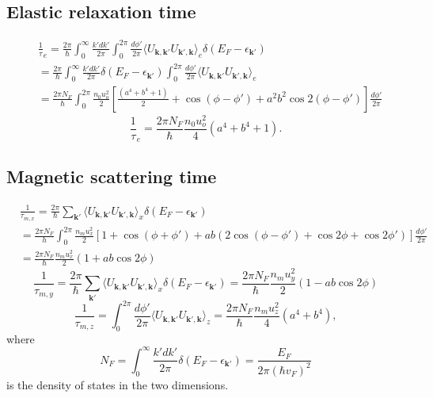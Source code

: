 \documentclass[aps,prb,amsmath,amssymb,footinbib,showpacs,twocolumn]{revtex4-2}
\begin{document}
\begin{widetext}
\subsection{Elastic relaxation time}
\begin{align}
  &\frac{1}{\tau}_{e}= \frac{2\pi}{\hbar}\int_{0}^{\infty}\frac{k'dk'}{2\pi}\int_{0}^{2\pi}\frac{d\phi'}{2\pi}\bigr \langle U_{\textbf{k},\textbf{k}'}U_{\textbf{k}',\textbf{k}}\bigl \rangle_{e}\delta(E_{F}-\epsilon_{\textbf{k}'}) \nonumber\\ &
 = \frac{2\pi}{\hbar}\int_{0}^{\infty}\frac{k'dk'}{2\pi}\delta(E_{F}-\epsilon_{\textbf{k}'})\int_{0}^{2\pi}\frac{d\phi'}{2\pi}\bigr \langle U_{\textbf{k},\textbf{k}'}U_{\textbf{k}',\textbf{k}}\bigl \rangle_{e}\nonumber\\&
 =\frac{2\pi N_{F}}{\hbar}\int_{0}^{2\pi}\frac{n_{0}u^{2}_{o}}{2}\left[\frac{(a^{4}+b^{4}+1)}{2}+\cos(\phi-\phi')+a^{2}b^{2}\cos2(\phi-\phi')\right]\frac{d\phi'}{2\pi} 
\end{align}
\begin{equation}
   \frac{1}{\tau}_{e}=  \frac{2\pi N_{F}}{\hbar}\frac{n_{0}u^{2}_{o}}{4}(a^{4}+b^{4}+1).
\end{equation}
\subsection{Magnetic scattering time}
\begin{align}
      &\frac{1}{\tau_{m,x}}=\frac{2\pi}{\hbar}\sum_{\textbf{k}'}\bigr \langle U_{\textbf{k},\textbf{k}'}U_{\textbf{k}',\textbf{k}}\bigl \rangle_{x}\delta(E_{F}-\epsilon_{\textbf{k}'})\nonumber\\&
      = \frac{2\pi N_{F}}{h}\int_{0}^{2\pi}\frac{n_{m}u^{2}_{x}}{2}\left[1+\cos(\phi+\phi')+ab(2\cos(\phi-\phi')+\cos2\phi+\cos2\phi')\right]\frac{d\phi'}{2\pi} \nonumber\\
     &= \frac{2\pi N_{F}}{\hbar}\frac{n_{m}u^{2}_{x}}{2}(1+ab\cos2\phi)
\end{align}
\begin{equation}
   \frac{1}{\tau_{m,y}}= \frac{2\pi}{\hbar}\sum_{\textbf{k}'}\bigr \langle U_{\textbf{k},\textbf{k}'}U_{\textbf{k}',\textbf{k}}\bigl \rangle_{x}\delta(E_{F}-\epsilon_{\textbf{k}'})=\frac{2\pi N_{F}}{\hbar}\frac{n_{m}u^{2}_{y}}{2}(1-ab\cos2\phi) 
\end{equation}
\begin{equation}
     \frac{1}{\tau_{m,z}} =  \int_{0}^{2\pi}\frac{d\phi'}{2\pi}\bigr \langle U_{\textbf{k},\textbf{k}'}U_{\textbf{k}',\textbf{k}}\bigl \rangle_{z}= \frac{2\pi N_{F}}{\hbar}\frac{n_{m}u^{2}_{z}}{4}(a^{4}+b^{4}),
\end{equation}
where
\begin{equation}
     N_{F}= \int_{0}^{\infty}\frac{k'dk'}{2\pi}\delta(E_{F}-\epsilon_{\textbf{k}'}) =\frac{E_{F}}{2\pi(\hbar v_{F})^2}
\end{equation}
is the density of states in the two dimensions.

\end{widetext}
\end{document}
